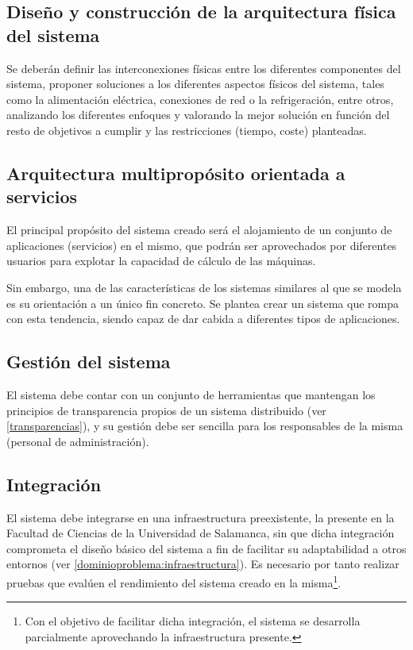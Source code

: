 \subsection{Diseño y construcción de la arquitectura física del sistema}
\label{obj1}
Se deberán definir las interconexiones físicas entre los diferentes componentes del sistema, proponer soluciones a los diferentes aspectos físicos del sistema, tales como la alimentación eléctrica, conexiones de red o la refrigeración, entre otros, analizando los diferentes enfoques y valorando la mejor solución en función del resto de objetivos a cumplir y las restricciones (tiempo, coste) planteadas.

\subsection{Arquitectura multipropósito orientada a servicios}
\label{obj2}
El principal propósito del sistema creado será el alojamiento de un conjunto de aplicaciones (servicios) en el mismo, que podrán ser aprovechados por diferentes usuarios para explotar la capacidad de cálculo de las máquinas.

Sin embargo, una de las características de los sistemas similares al que se modela es su orientación a un único fin concreto. Se plantea crear un sistema que rompa con esta tendencia, siendo capaz de dar cabida a diferentes tipos de aplicaciones.

\subsection{Gestión del sistema}
\label{obj3}
El sistema debe contar con un conjunto de herramientas que mantengan los principios de transparencia propios de un sistema distribuido (ver \ref{transparencias}), y su gestión debe ser sencilla para los responsables de la misma (personal de administración).

\subsection{Integración}
\label{obj4}
El sistema debe integrarse en una infraestructura preexistente, la presente en la Facultad de Ciencias de la Universidad de Salamanca, sin que dicha integración comprometa el diseño básico del sistema a fin de facilitar su adaptabilidad a otros entornos (ver \ref{dominioproblema:infraestructura}). Es necesario por tanto realizar pruebas que evalúen el rendimiento del sistema creado en la misma\footnote {Con el objetivo de facilitar dicha integración, el sistema se desarrolla parcialmente aprovechando la infraestructura presente.}.

